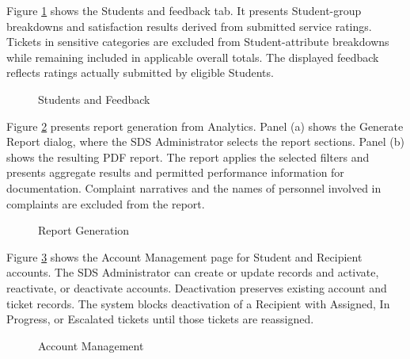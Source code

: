 Figure \ref{fig:feedback} shows the Students and feedback tab. It presents Student-group breakdowns and satisfaction results derived from submitted service ratings. Tickets in sensitive categories are excluded from Student-attribute breakdowns while remaining included in applicable overall totals. The displayed feedback reflects ratings actually submitted by eligible Students.

\renewcommand{\thefigure}{5.32}
\begin{figure}[htbp]
    \centering
    \caption{Students and Feedback}
    \label{fig:feedback}
\end{figure}
\FloatBarrier

Figure \ref{fig:report} presents report generation from Analytics. Panel (a) shows the Generate Report dialog, where the SDS Administrator selects the report sections. Panel (b) shows the resulting PDF report. The report applies the selected filters and presents aggregate results and permitted performance information for documentation. Complaint narratives and the names of personnel involved in complaints are excluded from the report.

\renewcommand{\thefigure}{5.33}
\begin{figure}[htbp]
    \centering
    \par{}\par
    \medskip
    \par{}\par
    \caption{Report Generation}
    \label{fig:report}
\end{figure}
\FloatBarrier

Figure \ref{fig:users} shows the Account Management page for Student and Recipient accounts. The SDS Administrator can create or update records and activate, reactivate, or deactivate accounts. Deactivation preserves existing account and ticket records. The system blocks deactivation of a Recipient with Assigned, In Progress, or Escalated tickets until those tickets are reassigned.

\renewcommand{\thefigure}{5.34}
\begin{figure}[htbp]
    \centering
    \caption{Account Management}
    \label{fig:users}
\end{figure}
\FloatBarrier

